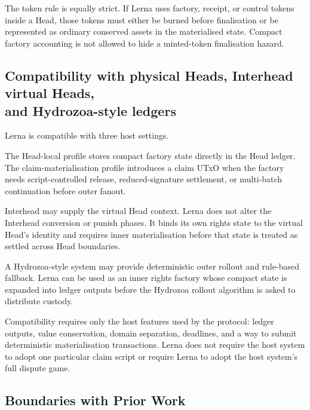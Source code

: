 \documentclass[a4paper,11pt]{article}
\theoremstyle{definition}
\theoremstyle{plain}
\theoremstyle{remark}
\begin{document}
The token rule is equally strict. If Lerna uses factory, receipt, or control
tokens inside a Head, those tokens must either be burned before finalisation or
be represented as ordinary conserved assets in the materialised state. Compact
factory accounting is not allowed to hide a minted-token finalisation hazard.

\subsection[Compatibility across host ledgers]{Compatibility with physical Heads, Interhead virtual Heads,\\and Hydrozoa-style ledgers}
\label{sec:compatibility}

Lerna is compatible with three host settings.

\begin{description}[leftmargin=3.8cm,style=nextline]
\item[Physical Hydra Head.]
The Head-local profile stores compact factory state directly in the Head
ledger. The claim-materialisation profile introduces a claim UTxO when the
factory needs script-controlled release, reduced-signature settlement, or
multi-batch continuation before outer fanout.

\item[Interhead virtual Head.]
Interhead may supply the virtual Head context. Lerna does not alter the
Interhead conversion or punish phases. It binds its own rights state to the
virtual Head's identity and requires inner materialisation before that state is
treated as settled across Head boundaries.

\item[Hydrozoa-style ledger.]
A Hydrozoa-style system may provide deterministic outer rollout and
rule-based fallback. Lerna can be used as an inner rights factory whose compact
state is expanded into ledger outputs before the Hydrozoa rollout algorithm is
asked to distribute custody.
\end{description}

Compatibility requires only the host features used by the protocol: ledger
outputs, value conservation, domain separation, deadlines, and a way to submit
deterministic materialisation transactions. Lerna does not require the host
system to adopt one particular claim script or require Lerna to adopt the host
system's full dispute game.

\subsection{Boundaries with Prior Work}
\label{sec:prior-work-boundaries}
\end{document}

